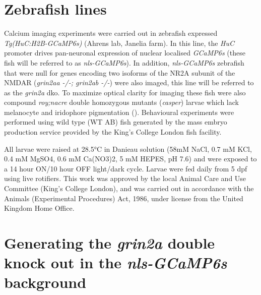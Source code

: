\section{Zebrafish lines}
Calcium imaging experiments were carried out in zebrafish expressed \textit{Tg(HuC:H2B-GCaMP6s)} (Ahrens lab, Janelia farm). In this line, the \textit{HuC} promoter drives pan-neuronal expression of nuclear localised \textit{GCaMP6s} (these fish will be referred to as \textit{nls-GCaMP6s}). In addition,  \textit{nls-GCaMP6s} zebrafish that were null for genes encoding two isoforms of the NR2A subunit of the NMDAR (\textit{grin2aa -/-; grin2ab -/-}) were also imaged, this line will be referred to as the \textit{grin2a} \gls{dko}. To maximize optical clarity for imaging these fish were also compound \textit{roy;nacre} double homozygous mutants (\textit{casper}) larvae which lack melanocyte and iridophore pigmentation (\cite{White2008}). Behavioural experiments were performed using wild type (WT AB) fish generated by the mass embryo production service provided by the King's College London fish facility.

All larvae were raised at 28.5°C in Danieau solution (58mM NaCl, 0.7 mM KCl, 0.4 mM MgSO4, 0.6 mM Ca(NO3)2, 5 mM HEPES, pH 7.6) and were exposed to a 14 hour ON/10 hour OFF light/dark cycle. Larvae were fed daily from 5 \gls{dpf} using live rotifiers.  This work was approved by the local Animal Care and Use Committee (King’s College London), and was carried out in accordance with the Animals (Experimental Procedures) Act, 1986, under license from the United Kingdom Home Office.

\section{Generating the \textit{grin2a} double knock out in the \emph{nls-GCaMP6s} background}
